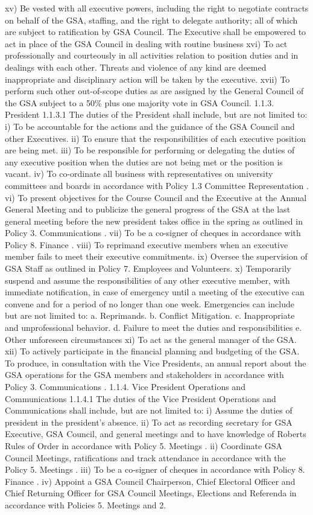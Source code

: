 xv) Be vested with all executive powers, including the right to negotiate contracts on behalf of the GSA, staffing, and the right to delegate authority; all of which are subject to ratification by GSA Council. The Executive shall be empowered to act in place of the GSA Council in dealing with routine business xvi) To act professionally and courteously in all activities relation to position duties and in dealings with each other. Threats and violence of any kind are deemed inappropriate and disciplinary action will be taken by the executive. xvii) To perform such other out-of-scope duties as are assigned by the General Council of the GSA subject to a 50\% plus one majority vote in GSA Council. 1.1.3. President 1.1.3.1 The duties of the President shall include, but are not limited to: i) To be accountable for the actions and the guidance of the GSA Council and other Executives. ii) To ensure that the responsibilities of each executive position are being met. iii) To be responsible for performing or delegating the duties of any executive position when the duties are not being met or the position is vacant. iv) To co-ordinate all business with representatives on university committees and boards in accordance with Policy 1.3 Committee Representation . vi) To present objectives for the Course Council and the Executive at the Annual General Meeting and to publicize the general progress of the GSA at the last general meeting before the new president takes office in the spring as outlined in Policy 3. Communications . vii) To be a co-signer of cheques in accordance with Policy 8. Finance . viii) To reprimand executive members when an executive member fails to meet their executive commitments. ix) Oversee the supervision of GSA Staff as outlined in Policy 7. Employees and Volunteers. x) Temporarily suspend and assume the responsibilities of any other executive member, with immediate notification, in case of emergency until a meeting of the executive can convene and for a period of no longer than one week. Emergencies can include but are not limited to: a. Reprimands. b. Conflict Mitigation. c. Inappropriate and unprofessional behavior. d. Failure to meet the duties and responsibilities e. Other unforeseen circumstances xi) To act as the general manager of the GSA. xii) To actively participate in the financial planning and budgeting of the GSA. To produce, in consultation with the Vice Presidents, an annual report about the GSA operations for the GSA members and stakeholders in accordance with Policy 3. Communications . 1.1.4. Vice President Operations and Communications 1.1.4.1 The duties of the Vice President Operations and Communications shall include, but are not limited to: i) Assume the duties of president in the president’s absence. ii) To act as recording secretary for GSA Executive, GSA Council, and general meetings and to have knowledge of Roberts Rules of Order in accordance with Policy 5. Meetings . ii) Coordinate GSA Council Meetings, ratifications and track attendance in accordance with the Policy 5. Meetings . iii) To be a co-signer of cheques in accordance with Policy 8. Finance . iv) Appoint a GSA Council Chairperson, Chief Electoral Officer and Chief Returning Officer for GSA Council Meetings, Elections and Referenda in accordance with Policies 5. Meetings and 2. 